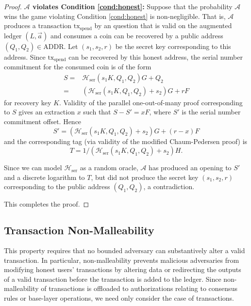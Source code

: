 \documentclass{llncs}
\newcommand{\hash}{\mathcal{H}}
\begin{document}
\begin{proof}
\textbf{$\mathcal{A}$ violates Condition \ref{cond:honest}:} Suppose that the probability $\mathcal{A}$ wins the game violating Condition \ref{cond:honest} is non-negligible.
That is, $\mathcal{A}$ produces a  transaction $\text{tx}_{\text{spend}}$ by an  question that is valid on the augmented ledger $(L, \vec{a})$ and consumes a coin can be recovered by a public address $(Q_1, Q_2) \in \text{ADDR}$.
Let $(s_1,s_2,r)$ be the secret key corresponding to this address.
Since $\text{tx}_{\text{spend}}$ can be recovered by this honest address, the serial number commitment for the consumed coin is of the form
\begin{align*}
S =& \hash_{\text{ser}}(s_1 K, Q_1, Q_2)G + Q_2 \\
=& (\hash_{\text{ser}}(s_1 K, Q_1, Q_2) + s_2)G + rF
\end{align*}
for recovery key $K$.
Validity of the parallel one-out-of-many proof corresponding to $S$ gives an extraction $x$ such that $S - S' = xF$, where $S'$ is the serial number commitment offset.
Hence $$S' = (\hash_{\text{ser}}(s_1 K, Q_1, Q_2) + s_2)G + (r - x)F$$ and the corresponding tag (via validity of the modified Chaum-Pedersen proof) is $$T = 1/(\hash_{\text{ser}}(s_1 K, Q_1, Q_2) + s_2)H.$$

Since we can model $\hash_{\text{ser}}$ as a random oracle, $\mathcal{A}$ has produced an opening to $S'$ and a discrete logarithm to $T$, but did not produce the secret key $(s_1,s_2,r)$ corresponding to the public address $(Q_1,Q_2)$, a contradiction.

This completes the proof.
\end{proof}


\subsection{Transaction Non-Malleability}

This property requires that no bounded adversary can substantively alter a valid transaction. 
In particular, non-malleability prevents malicious adversaries from modifying honest users' transactions by altering data or redirecting the outputs of a valid transaction before the transaction is added to the ledger.
Since non-malleability of  transactions is offloaded to authorizations relating to consensus rules or base-layer operations, we need only consider the case of  transactions.
\end{document}
